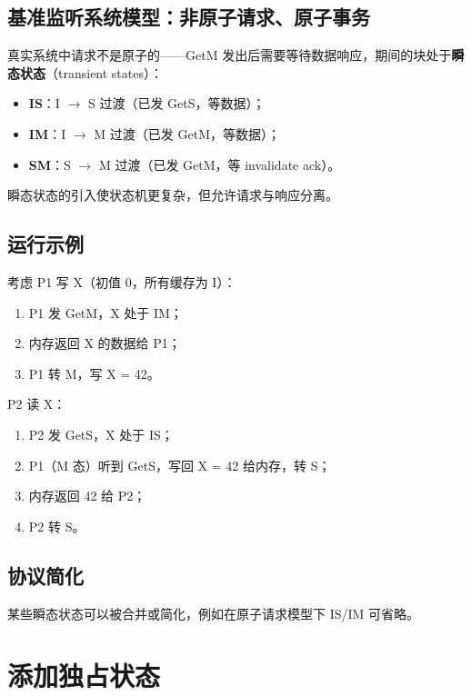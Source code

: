 \subsection{基准监听系统模型：非原子请求、原子事务}

真实系统中请求不是原子的——GetM 发出后需要等待数据响应，期间的块处于\textbf{瞬态状态}（transient states）：

\begin{itemize}
\item \textbf{IS}：I $\rightarrow$ S 过渡（已发 GetS，等数据）；
\item \textbf{IM}：I $\rightarrow$ M 过渡（已发 GetM，等数据）；
\item \textbf{SM}：S $\rightarrow$ M 过渡（已发 GetM，等 invalidate ack）。
\end{itemize}


瞬态状态的引入使状态机更复杂，但允许请求与响应分离。

\subsection{运行示例}

考虑 P1 写 X（初值 0，所有缓存为 I）：

\begin{enumerate}
\item P1 发 GetM，X 处于 IM；
\item 内存返回 X 的数据给 P1；
\item P1 转 M，写 X = 42。
\end{enumerate}


P2 读 X：

\begin{enumerate}
\item P2 发 GetS，X 处于 IS；
\item P1（M 态）听到 GetS，写回 X = 42 给内存，转 S；
\item 内存返回 42 给 P2；
\item P2 转 S。
\end{enumerate}


\subsection{协议简化}

某些瞬态状态可以被合并或简化，例如在原子请求模型下 IS/IM 可省略。

\section{添加独占状态}

